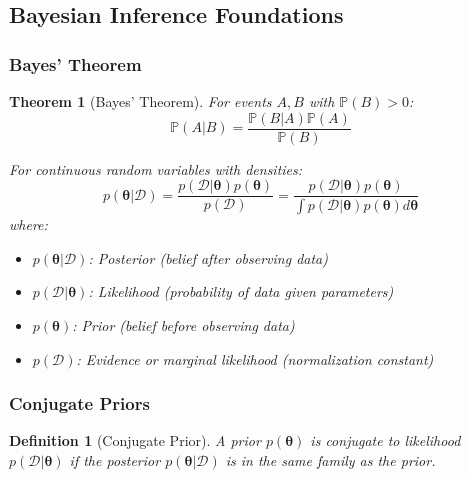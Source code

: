 \documentclass[11pt]{article}
\newtheorem{theorem}{Theorem}[section]
\newtheorem{definition}{Definition}[section]
\begin{document}
\subsection{Bayesian Inference Foundations}

\subsubsection{Bayes' Theorem}

\begin{theorem}[Bayes' Theorem]
For events $A, B$ with $\mathbb{P}(B) > 0$:
\begin{equation}
\mathbb{P}(A|B) = \frac{\mathbb{P}(B|A)\mathbb{P}(A)}{\mathbb{P}(B)}
\end{equation}

For continuous random variables with densities:
\begin{equation}
p(\bm{\theta}|\mathcal{D}) = \frac{p(\mathcal{D}|\bm{\theta})p(\bm{\theta})}{p(\mathcal{D})} = \frac{p(\mathcal{D}|\bm{\theta})p(\bm{\theta})}{\int p(\mathcal{D}|\bm{\theta})p(\bm{\theta})d\bm{\theta}}
\end{equation}
where:
\begin{itemize}
\item $p(\bm{\theta}|\mathcal{D})$: Posterior (belief after observing data)
\item $p(\mathcal{D}|\bm{\theta})$: Likelihood (probability of data given parameters)
\item $p(\bm{\theta})$: Prior (belief before observing data)
\item $p(\mathcal{D})$: Evidence or marginal likelihood (normalization constant)
\end{itemize}
\end{theorem}

\subsubsection{Conjugate Priors}

\begin{definition}[Conjugate Prior]
A prior $p(\bm{\theta})$ is conjugate to likelihood $p(\mathcal{D}|\bm{\theta})$ if the posterior $p(\bm{\theta}|\mathcal{D})$ is in the same family as the prior.
\end{definition}
\end{document}
